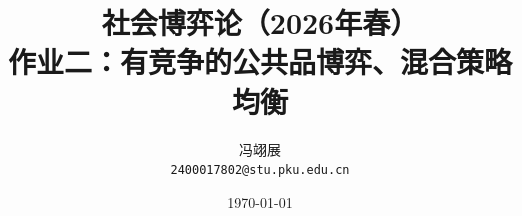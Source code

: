\title{\textbf{社会博弈论（2026年春）} \\[0.5em]
    \Large 作业二：有竞争的公共品博弈、混合策略均衡}
\author{冯翊展 \\ 
    \normalsize{\texttt{2400017802@stu.pku.edu.cn}}}
\date{\today}

